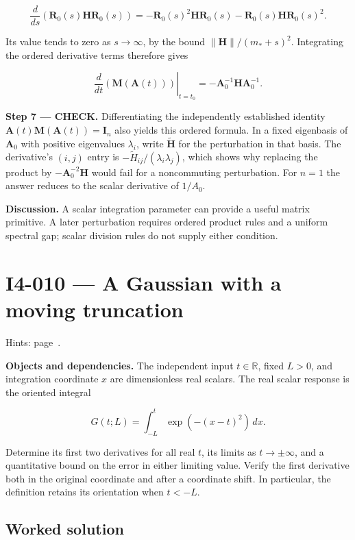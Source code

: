 \documentclass[11pt,oneside,openany]{book}
\begin{document}
\[
\frac{d}{ds}(\mathbf R_0(s)\mathbf H\mathbf R_0(s))
=-\mathbf R_0(s)^2\mathbf H\mathbf R_0(s)
-\mathbf R_0(s)\mathbf H\mathbf R_0(s)^2.
\]

Its value tends to zero as \(s\to\infty\), by the bound \(\|\mathbf H\|/(m_*+s)^2\). Integrating the ordered derivative terms therefore gives

\[
\left.\frac{d}{dt}(\mathbf M(\mathbf A(t)))\right|_{t=t_0}
=-\mathbf A_0^{-1}\mathbf H\mathbf A_0^{-1}.
\]

\endgroup
\textbf{Step 7 --- CHECK.} Differentiating the independently established identity \(\mathbf A(t)\mathbf M(\mathbf A(t))=\mathbf I_n\) also yields this ordered formula. In a fixed eigenbasis of \(\mathbf A_0\) with positive eigenvalues \(\lambda_i\), write \(\widetilde{\mathbf H}\) for the perturbation in that basis. The derivative's \((i,j)\) entry is \(-\widetilde H_{ij}/(\lambda_i\lambda_j)\), which shows why replacing the product by \(-\mathbf A_0^{-2}\mathbf H\) would fail for a noncommuting perturbation. For \(n=1\) the answer reduces to the scalar derivative of \(1/A_0\).

\textbf{Discussion.} A scalar integration parameter can provide a useful matrix primitive. A later perturbation requires ordered product rules and a uniform spectral gap; scalar division rules do not supply either condition.
\clearpage
\section{I4-010 --- A Gaussian with a moving truncation}
\label{problem:I4-010}
{\small Hints: page~\pageref{hints:I4-010}.}\par\medskip

\textbf{Objects and dependencies.} The independent input \(t\in\mathbb R\), fixed \(L>0\), and integration coordinate \(x\) are dimensionless real scalars. The real scalar response is the oriented integral

\[
G(t;L)=\int_{-L}^{t}\exp(-(x-t)^2)\,dx.
\]

Determine its first two derivatives for all real \(t\), its limits as \(t\to\pm\infty\), and a quantitative bound on the error in either limiting value. Verify the first derivative both in the original coordinate and after a coordinate shift. In particular, the definition retains its orientation when \(t<-L\).
\subsection*{Worked solution}
\end{document}
